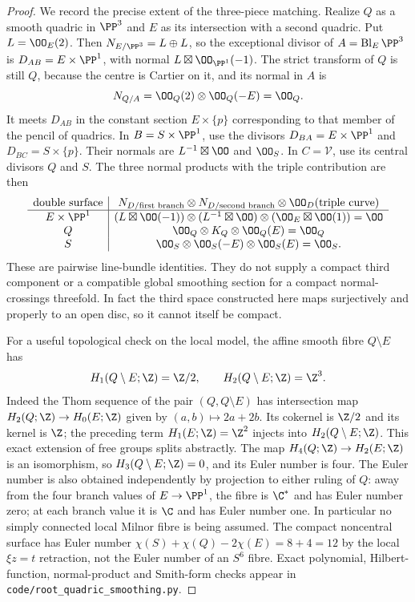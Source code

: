 \begin{proof}
We record the precise extent of the three-piece matching.
Realize $Q$ as a smooth quadric in $\PP^3$ and $E$ as its
intersection with a second quadric.  Put $L=\OO_E(2)$.
Then $N_{E/\PP^3}=L\oplus L$, so the exceptional divisor
of $A=\operatorname{Bl}_E\PP^3$ is
$D_{AB}=E\times\PP^1$, with normal
$L\boxtimes\OO_{\PP^1}(-1)$.
The strict transform of $Q$ is still $Q$, because the centre is
Cartier on it, and its normal in $A$ is
\[
 N_{Q/A}=\OO_Q(2)\otimes\OO_Q(-E)=\OO_Q.
\]
It meets $D_{AB}$ in the constant section $E\times\{p\}$
corresponding to that member of the pencil of quadrics.
In $B=S\times\PP^1$, use the divisors
$D_{BA}=E\times\PP^1$ and $D_{BC}=S\times\{p\}$.
Their normals are $L^{-1}\boxtimes\OO$ and $\OO_S$.
In $C=\mathcal V$, use its central divisors $Q$ and $S$.
The three normal products with the triple contribution are then
\[
\begin{array}{c|c}
 \text{double surface}&
 N_{D/\text{first branch}}\otimes
 N_{D/\text{second branch}}\otimes\OO_D(\text{triple curve})\\ \hline
 E\times\PP^1&
 (L\boxtimes\OO(-1))\otimes(L^{-1}\boxtimes\OO)
       \otimes(\OO_E\boxtimes\OO(1))=\OO\\
 Q&\OO_Q\otimes K_Q\otimes\OO_Q(E)=\OO_Q\\
 S&\OO_S\otimes\OO_S(-E)\otimes\OO_S(E)=\OO_S.
\end{array}
\]
These are pairwise line-bundle identities.  They do not supply
a compact third component or a compatible global smoothing
section for a compact normal-crossings threefold.
In fact the third space constructed here maps surjectively and
properly to an open disc, so it cannot itself be compact.

For a useful topological check on the local model,
the affine smooth fibre $Q\setminus E$ has
\[
 H_1(Q\setminus E;\Z)=\Z/2,\qquad
 H_2(Q\setminus E;\Z)=\Z^3.
\]
Indeed the Thom sequence of the pair $(Q,Q\setminus E)$ has
intersection map $H_2(Q;\Z)\to H_0(E;\Z)$ given by
$(a,b)\mapsto2a+2b$.  Its cokernel is $\Z/2$ and its
kernel is $\Z$; the preceding term $H_1(E;\Z)=\Z^2$
injects into $H_2(Q\setminus E;\Z)$.
This exact extension of free groups splits abstractly.
The map $H_4(Q;\Z)\to H_2(E;\Z)$ is an isomorphism,
so $H_3(Q\setminus E;\Z)=0$, and its Euler number is four.
The Euler number is also obtained independently by projection
to either ruling of $Q$: away from the four branch values of
$E\to\PP^1$, the fibre is $\C^*$ and has Euler number zero;
at each branch value it is $\C$ and has Euler number one.
In particular no simply connected local Milnor fibre is being
assumed.  The compact noncentral surface has Euler number
$\chi(S)+\chi(Q)-2\chi(E)=8+4=12$ by the local
$\xi z=t$ retraction, not the Euler number of an $S^6$ fibre.
Exact polynomial, Hilbert-function, normal-product and Smith-form
checks appear in \texttt{code/root\_quadric\_smoothing.py}.
\end{proof}

